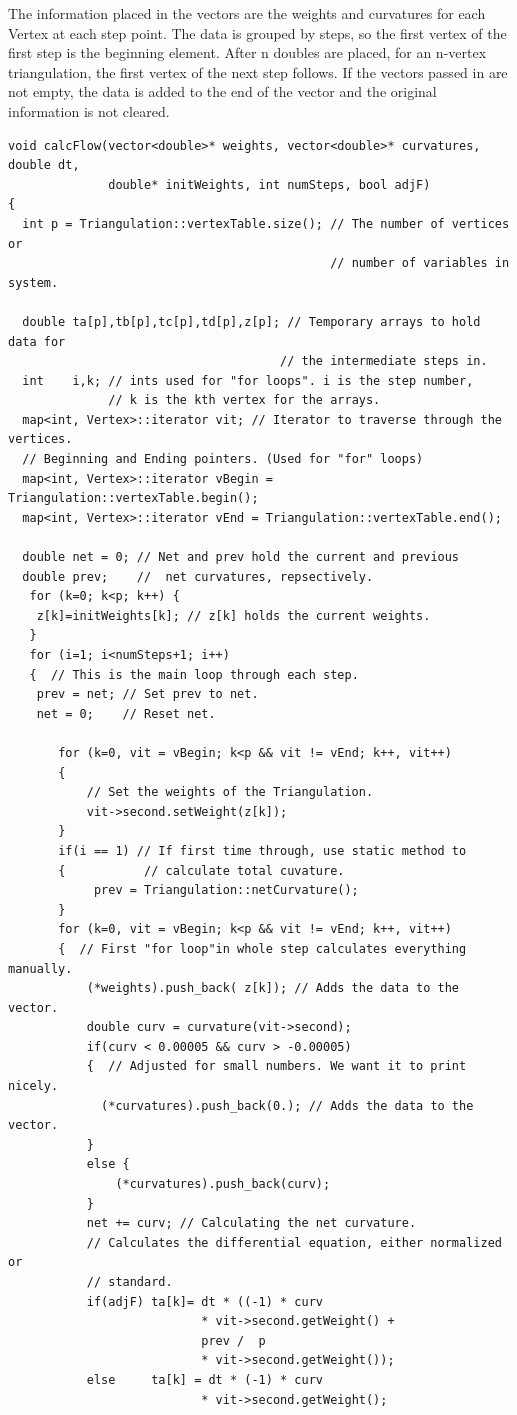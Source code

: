 \documentclass[12pt]{article}
\begin{document}
\noindent The information placed in the vectors are the weights and curvatures for each Vertex at each step point. The data is grouped by steps, so the first vertex of the first step is the beginning element. After n doubles are placed, for an n-vertex triangulation, the first vertex of the next step follows. If the vectors passed in are not empty, the data is added to the end of the vector and the original information is not cleared.

\label{calcFlowCode}
\begin{verbatim}
void calcFlow(vector<double>* weights, vector<double>* curvatures, double dt, 
              double* initWeights, int numSteps, bool adjF)  
{
  int p = Triangulation::vertexTable.size(); // The number of vertices or 
                                             // number of variables in system.
                                         
  double ta[p],tb[p],tc[p],td[p],z[p]; // Temporary arrays to hold data for 
                                      // the intermediate steps in.
  int    i,k; // ints used for "for loops". i is the step number,
              // k is the kth vertex for the arrays.
  map<int, Vertex>::iterator vit; // Iterator to traverse through the vertices.
  // Beginning and Ending pointers. (Used for "for" loops)
  map<int, Vertex>::iterator vBegin = Triangulation::vertexTable.begin();
  map<int, Vertex>::iterator vEnd = Triangulation::vertexTable.end();
  
  double net = 0; // Net and prev hold the current and previous
  double prev;    //  net curvatures, repsectively.
   for (k=0; k<p; k++) {
    z[k]=initWeights[k]; // z[k] holds the current weights.
   }
   for (i=1; i<numSteps+1; i++)
   {  // This is the main loop through each step.
    prev = net; // Set prev to net.
    net = 0;    // Reset net.
    
       for (k=0, vit = vBegin; k<p && vit != vEnd; k++, vit++)  
       {
           // Set the weights of the Triangulation.
           vit->second.setWeight(z[k]);
       }
       if(i == 1) // If first time through, use static method to 
       {           // calculate total cuvature.
            prev = Triangulation::netCurvature();
       }
       for (k=0, vit = vBegin; k<p && vit != vEnd; k++, vit++) 
       {  // First "for loop"in whole step calculates everything manually.
           (*weights).push_back( z[k]); // Adds the data to the vector.
           double curv = curvature(vit->second);
           if(curv < 0.00005 && curv > -0.00005) 
           {  // Adjusted for small numbers. We want it to print nicely.
             (*curvatures).push_back(0.); // Adds the data to the vector.
           }
           else {
               (*curvatures).push_back(curv);
           }
           net += curv; // Calculating the net curvature.
           // Calculates the differential equation, either normalized or
           // standard.
           if(adjF) ta[k]= dt * ((-1) * curv 
                           * vit->second.getWeight() +
                           prev /  p
                           * vit->second.getWeight());
           else     ta[k] = dt * (-1) * curv 
                           * vit->second.getWeight();
           

\end{verbatim}
\end{document}
